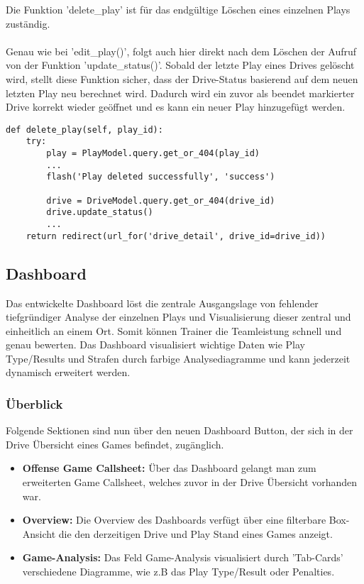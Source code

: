 \newpage
\noindent
Die Funktion 'delete\_play' ist für das endgültige Löschen eines einzelnen Plays zuständig.
\\
\\
Genau wie bei 'edit\_play()', folgt auch hier direkt nach dem Löschen der Aufruf von der Funktion 'update\_status()'. Sobald der letzte Play eines Drives gelöscht wird, stellt diese Funktion sicher, dass der Drive-Status basierend auf dem neuen letzten Play neu berechnet wird. Dadurch wird ein zuvor als beendet markierter Drive korrekt wieder geöffnet und es kann ein neuer Play hinzugefügt werden.
\begin{verbatim}
def delete_play(self, play_id):
    try:
        play = PlayModel.query.get_or_404(play_id)
        ...
        flash('Play deleted successfully', 'success')

        drive = DriveModel.query.get_or_404(drive_id)
        drive.update_status()
        ...
    return redirect(url_for('drive_detail', drive_id=drive_id))
\end{verbatim}
\subsection{Dashboard}
Das entwickelte Dashboard löst die zentrale Ausgangslage von fehlender tiefgründiger Analyse der einzelnen Plays und Visualisierung dieser zentral und einheitlich an einem Ort. Somit können Trainer die Teamleistung schnell und genau bewerten. Das Dashboard visualisiert wichtige Daten wie Play Type/Results und Strafen durch farbige Analysediagramme und kann jederzeit dynamisch erweitert werden.
\subsubsection{Überblick}
Folgende Sektionen sind nun über den neuen Dashboard Button, der sich in der Drive Übersicht eines Games befindet, zugänglich.
\begin{itemize}
    \item \textbf{Offense Game Callsheet:} Über das Dashboard gelangt man zum erweiterten Game Callsheet, welches zuvor in der Drive Übersicht vorhanden war.
    \item \textbf{Overview:} Die Overview des Dashboards verfügt über eine filterbare Box-Ansicht die den derzeitigen Drive und Play Stand eines Games anzeigt.
    \item \textbf{Game-Analysis:} Das Feld Game-Analysis visualisiert durch 'Tab-Cards' verschiedene Diagramme, wie z.B das Play Type/Result oder Penalties.
    \end{itemize}
\newpage
